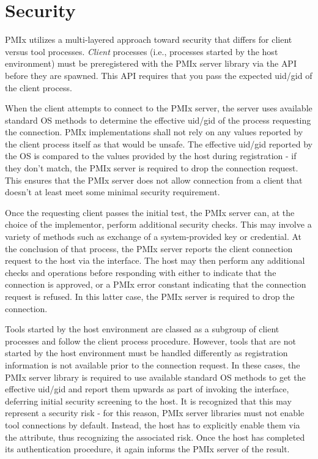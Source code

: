 \chapter{Security}
\label{chap:api_security}

\ac{PMIx} utilizes a multi-layered approach toward security that differs for client versus tool processes. \emph{Client} processes (i.e., processes started by the host environment) must be preregistered with the \ac{PMIx} server library via the  \ac{API} before they are spawned. This \ac{API} requires that you pass the expected uid/gid of the client process.

When the client attempts to connect to the \ac{PMIx} server, the server uses available standard \ac{OS} methods to determine the effective uid/gid of the process requesting the connection. \ac{PMIx} implementations shall not rely on any values reported by the client process itself as that would be unsafe. The effective uid/gid reported by the \ac{OS} is compared to the values provided by the host during registration - if they don't match, the \ac{PMIx} server is required to drop the connection request. This ensures that the \ac{PMIx} server does not allow connection from a client that doesn't at least meet some minimal security requirement.

Once the requesting client passes the initial test, the \ac{PMIx} server can, at the choice of the implementor, perform additional security checks. This may involve a variety of methods such as exchange of a system-provided key or credential. At the conclusion of that process, the \ac{PMIx} server reports the client connection request to the host via the  interface. The host may then perform any additional checks and operations before responding with either  to indicate that the connection is approved, or a \ac{PMIx} error constant indicating that the connection request is refused. In this latter case, the \ac{PMIx} server is required to drop the connection.

Tools started by the host environment are classed as a subgroup of client processes and follow the client process procedure. However, tools that are not started by the host environment must be handled differently as registration information is not available prior to the connection request. In these cases, the \ac{PMIx} server library is required to use available standard \ac{OS} methods to get the effective uid/gid and report them upwards as part of invoking the  interface, deferring initial security screening to the host. It is recognized that this may represent a security risk - for this reason, \ac{PMIx} server libraries must not enable tool connections by default. Instead, the host has to explicitly enable them via the  attribute, thus recognizing the associated risk. Once the host has completed its authentication procedure, it again informs the \ac{PMIx} server of the result.

